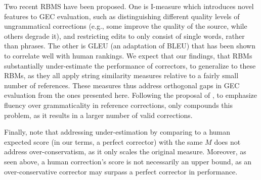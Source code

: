 \documentclass[letterpaper, 11pt]{article}
\begin{document}
Two recent RBMS have been proposed.
One is {\sc I-measure} \cite{felice2015towards}
which introduces novel features to GEC evaluation, such as distinguishing
different quality levels of ungrammatical corrections (e.g., some improve the quality of
the source, while others degrade it), and restricting edits to only consist of single words,
rather than phrases. The other is GLEU \cite{napoles2015ground} (an adaptation of BLEU) that has
been shown to correlate well with human rankings. We expect that our findings, that RBMs substantially under-estimate the
performance of correctors, to generalize to these RBMs, as they all
apply string similarity measures relative to a fairly small number of references.
These measures thus address orthogonal gaps in GEC evaluation from the ones presented here.
Following the proposal of , to emphasize fluency over grammaticality
in reference corrections, only compounds this problem, as it results in a larger number of valid corrections.


Finally, note that addressing under-estimation by comparing to
a human expected score (in our terms, a perfect corrector) with the same $M$ \cite{bryant2015far} does not address over-conservatism, as it only
scales the original measure. Moreover, as seen above, a human correction's score
is not necessarily an upper bound, as an over-conservative corrector may surpass a perfect corrector in performance.
\end{document}
